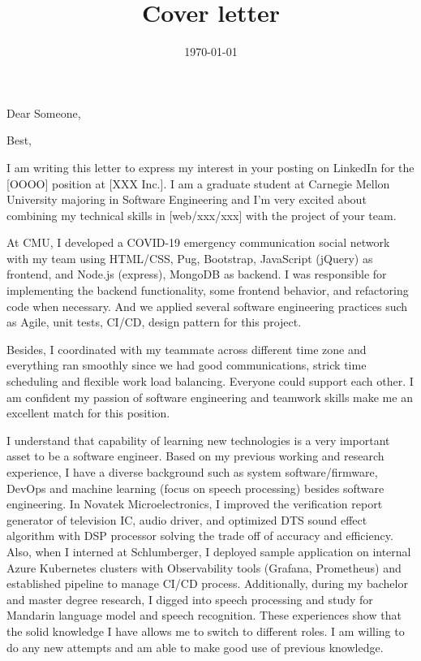 \documentclass[11pt,a4paper,roman]{moderncv}        %
\title{Cover letter}                               %
\begin{document}
\newcommand{\whoItMayConcern}{Dear Someone}
\newcommand{\position}{[OOOO] }
\newcommand{\company}{[XXX Inc.]}
\newcommand{\skills}{[web/xxx/xxx] }
\recipient{\ }{}
\date{\today}
\opening{\whoItMayConcern,}
\closing{Best,}
\makelettertitle

I am writing this letter to express my interest in your posting on LinkedIn 
for the \position position at \company. 
I am a graduate student at Carnegie Mellon University majoring in Software Engineering 
and I'm very excited about combining my technical skills in 
\skills with the project of your team.

At CMU, I developed a COVID-19 emergency communication social network with my team using HTML/CSS, Pug, Bootstrap, JavaScript
(jQuery) as frontend, and Node.js (express), MongoDB as backend.
I was responsible for implementing the backend functionality, some frontend behavior, 
and refactoring code when necessary.
And we applied several software engineering practices such as Agile, unit tests, 
CI/CD, design pattern for this project. 

Besides, I coordinated with my teammate across different time zone and everything ran smoothly since we had good communications, 
strick time scheduling and flexible work load balancing. 
Everyone could support each other. 
I am confident my passion of software engineering and teamwork skills make me an excellent match for this position.


I understand that capability of learning new technologies is a very important asset to be a software engineer.
Based on my previous working and research experience, I have a diverse background such as system software/firmware, DevOps and machine learning (focus on speech processing) besides software engineering.
In Novatek Microelectronics, I improved the verification report generator of television IC, audio driver, and optimized DTS sound effect algorithm with DSP processor solving the trade off of accuracy and efficiency.
Also, when I interned at Schlumberger, I deployed sample application on internal Azure Kubernetes clusters with Observability tools (Grafana, Prometheus) and established pipeline to manage CI/CD process. Additionally, during my bachelor and master degree research, I digged into speech processing and study for Mandarin language model and speech recognition.
These experiences show that the solid knowledge I have allows me to switch to different roles.
I am willing to do any new attempts and am able to make good use of previous knowledge.
\end{document}
